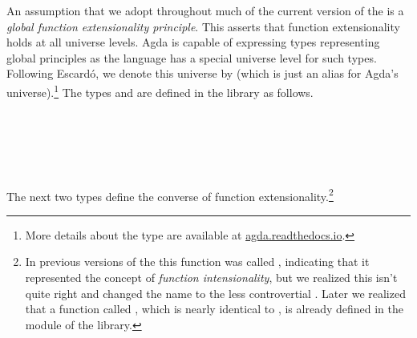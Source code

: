 An assumption that we adopt throughout much of the current version of the \ualib is a \emph{global function extensionality principle}. This asserts that function extensionality holds at all universe levels. Agda is capable of expressing types representing global principles as the language has a special universe level for such types.
Following Escardó, we denote this universe by  (which is just an alias for Agda's  universe).\footnote{More details about the  type are available at
\href{https://agda.readthedocs.io/en/latest/language/universe-levels.html\#expressions-of-kind-set}{agda.readthedocs.io}.}
The types  and  are defined in the \typetopology library as follows.
\ccpad
\begin{code}%
\>[1]\AgdaSpace{}%
\AgdaSymbol{:}\AgdaSpace{}%
\<%
\\
%
\>[1]\AgdaSpace{}%
\AgdaSymbol{=}\AgdaSpace{}%
%
\>[20]\AgdaSymbol{\{}\AgdaSpace{}%
\AgdaSymbol{\}}\AgdaSpace{}%
\AgdaSpace{}%
\AgdaSpace{}%
\AgdaSpace{}%
\<%
\\
%
\\[\AgdaEmptyExtraSkip]%
%
\>[1]\AgdaSpace{}%
\AgdaSymbol{:}\AgdaSpace{}%
\<%
\\
%
\>[1]\AgdaSpace{}%
\AgdaSymbol{=}\AgdaSpace{}%
\AgdaSpace{}%
\AgdaSymbol{\{}\AgdaSpace{}%
\AgdaSymbol{\}}\AgdaSpace{}%
\AgdaSpace{}%
\AgdaSpace{}%
\AgdaSpace{}%
\<%
\end{code}
\ccpad
The next two types define the converse of function extensionality.\footnote{In previous versions of the
\ualib this function was called , indicating that it represented the concept of \emph{function intensionality}, but we realized this isn't quite right and changed the name to the less controvertial . Later we realized that a function called , which is nearly identical to , is already defined in the  module of the \typetopology library.}
\ccpad
